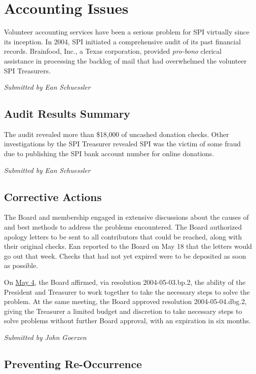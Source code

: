 \documentclass[letterpaper]{report}
\begin{document}
\section{Accounting Issues}

Volunteer accounting services have been a serious problem for SPI
virtually since its inception. In 2004, SPI initiated a comprehensive
audit of its past financial records. Brainfood, Inc., a Texas corporation,
provided \emph{pro-bono} clerical assistance in processing the backlog
of mail that had overwhelmed the volunteer SPI Treasurers.

\emph{Submitted by Ean Schuessler}


\subsection{Audit Results Summary}

The audit revealed more than \$18,000 of uncashed donation checks.
Other investigations by the SPI Treasurer revealed SPI was the victim
of some fraud due to publishing the SPI bank account number for online
donations.

\emph{Submitted by Ean Schuessler}


\subsection{Corrective Actions}

The Board and membership engaged in extensive discussions about the
causes of and best methods to address the problems encountered. The
Board authorized apology letters to be sent to all contributors that
could be reached, along with their original checks. Ean reported to
the Board on May 18 that the letters would go out that week. Checks
that had not yet expired were to be deposited as soon as possible.

On \href{http://lists.spi-inc.org/pipermail/spi-announce/2004/000074.html}{May 4},
the Board affirmed, via resolution 2004-05-03.bp.2, the ability of
the President and Treasurer to work together to take the necessary
steps to solve the problem. At the same meeting, the Board approved
resolution 2004-05-04.dbg.2, giving the Treasurer a limited budget
and discretion to take necessary steps to solve problems without further
Board approval, with an expiration in six months.

\emph{Submitted by John Goerzen}


\subsection{Preventing Re-Occurrence}
\end{document}
